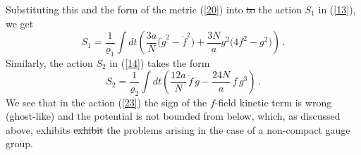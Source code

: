 \documentclass[11pt, a4paper]{article}
\newcommand{\lang}[1]{\textcolor{langfix}{#1}}
\newcommand{\subst}[1]{\textcolor{substantive}{#1}}
\newcommand{\rem}[1]{\textcolor{removeprop}{\sout{#1}}}
\begin{document}
Substituting this and the form of the metric (\ref{20}) \lang{into} \rem{to} the action $S_1$ in (\ref{13}), we get
\begin{equation}
S_1 =\frac{1}{\varrho_1}\int dt \left( \frac{3a}{N}\Big(\dot{g}^2 -\dot{f}^2\Big) + \frac{3N}{a} g^2\Big(4f^2-g^2\Big) \right)\,.\label{23}
\end{equation}
Similarly, the action $S_2$ in (\ref{14}) takes the form
\begin{equation}
S_2 =\frac{1}{\varrho_2}\int dt \left( \frac{12a}{N}\, \dot f\,\dot g - \frac{24N}{a}\, f\, g^3\right)\,.\label{24}
\end{equation}
We see that in the action (\ref{23}) the sign of the \subst{$f$-field} kinetic term is wrong \subst{(ghost-like)} and the potential is not bounded from below, which, as discussed above, \lang{exhibits} \rem{exhibit} the problems arising in the case of a non-compact gauge group.
\end{document}
